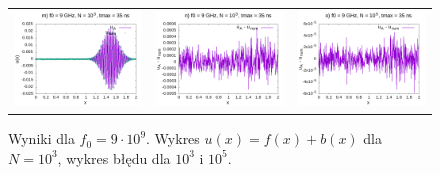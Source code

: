 \documentclass[11pt,a4paper]{report}
\begin{document}
\begin{figure}
\begin{tabular}{ccc}
\includegraphics[width=55mm]{plots/9/mc9_3_35} &   \includegraphics[width=55mm]{plots/9/mc9_3_35_dif} &   \includegraphics[width=55mm]{plots/9/mc9_5_35_dif} \\
\end{tabular}
\caption{Wyniki dla $f_0 = 9 \cdot 10^9$. Wykres $u(x) = f(x)+b(x)$ dla $N = 10^3$, wykres błędu dla $10^3$ i $10^5$.}
\end{figure}
\newpage
\end{document}
